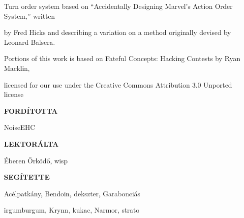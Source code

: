 \begin{center}
Turn order system based on “Accidentally Designing Marvel’s Action Order System,” written

by Fred Hicks and describing a variation on a method originally devised by Leonard Balsera.

Portions of this work is based on Fateful Concepts: Hacking Contests by Ryan Macklin,

licensed for our use under the Creative Commons Attribution 3.0 Unported license

\vspace{2em}

\textbf{FORDÍTOTTA}

NoiseEHC

\textbf{LEKTORÁLTA}

Éberen Őrködő, wisp

\textbf{SEGÍTETTE}

Acélpatkány, Bendoin, dekszter, Garabonciás

irgumburgum, Krynn, kukac, Narmor, strato
\end{center}
